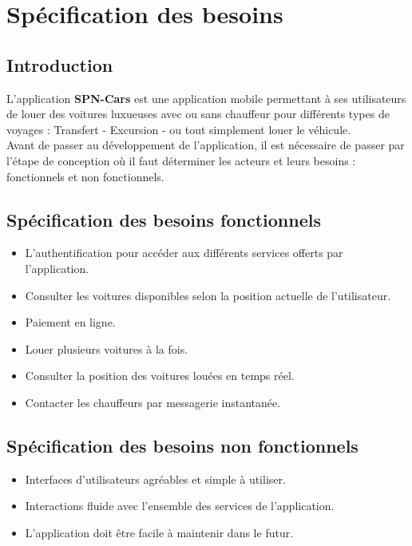 \chapter{Spécification des besoins}
\minitoc
\clearpage
\section*{Introduction}
L'application \textbf{SPN-Cars} est une application mobile permettant à ses utilisateurs de louer des voitures luxueuses avec ou sans chauffeur pour différents types de voyages : Transfert - Excursion - ou tout simplement louer le véhicule.\\
\noindent Avant de passer au développement de l'application, il est nécessaire de passer par l'étape de conception où il faut déterminer les acteurs et leurs besoins : fonctionnels et non fonctionnels.
\section{Spécification des besoins fonctionnels}
\begin{itemize}
    \item L'authentification pour accéder aux différents services offerts par l'application.
    \item Consulter les voitures disponibles selon la position actuelle de l'utilisateur.
    \item Paiement en ligne.
    \item Louer plusieurs voitures à la fois.
    \item Consulter la position des voitures louées en temps réel.
    \item Contacter les chauffeurs par messagerie instantanée.
\end{itemize}
\section{Spécification des besoins non fonctionnels}
\begin{itemize}
    \item Interfaces d'utilisateurs agréables et simple à utiliser.
    \item Interactions fluide avec l'ensemble des services de l'application.
    \item L'application doit être facile à maintenir dans le futur.
\end{itemize}
